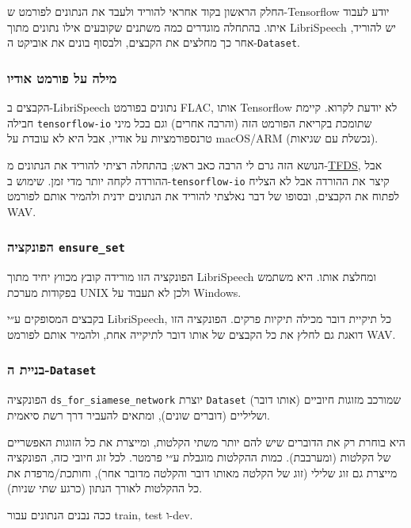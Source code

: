 \documentclass[a4paper]{article}
\begin{document}
החלק הראשון בקוד אחראי להוריד ולעבד את הנתונים לפורמט ש-Tensorflow
יודע לעבוד איתו. בהתחלה מוגדרים כמה משתנים שקובעים אילו נתונים מתוך
LibriSpeech יש להוריד, אחר כך מחלצים את הקבצים, ולבסוף בונים את אוביקט
ה-\texttt{Dataset}.

\subsubsection{מילה על פורמט אודיו}
\label{sec:wav}

הקבצים ב-LibriSpeech נתונים בפורמט FLAC, אותו Tensorflow לא יודעת
לקרוא. קיימת חבילה \texttt{tensorflow-io} שתומכת בקריאת הפורמט הזה
(והרבה אחרים) וגם בכל מיני טרנספורמציות על אודיו, אבל היא לא עובדת על
macOS/ARM (נכשלת עם שגיאות).

הנושא הזה גרם לי הרבה כאב ראש; בהתחלה רציתי להוריד את הנתונים
מ-\href{https://www.tensorflow.org/datasets/catalog/librispeech}{TFDS},
אבל ההורדה לקחה יותר מדי זמן. שימוש ב-\texttt{tensorflow-io} קיצר את
ההורדה אבל לא הצליח לפתוח את הקבצים, ובסופו של דבר נאלצתי להוריד את
הנתונים ידנית ולהמיר אותם לפורמט WAV.

\subsubsection{הפונקציה \texttt{ensure\_set}}
\label{sec:code-ensure_set}

הפונקציה הזו מורידה קובץ מכווץ יחיד מתוך LibriSpeech ומחלצת אותו. היא
משתמש בפקודות מערכת UNIX ולכן לא תעבוד על Windows.

בקבצים המסופקים ע״י LibriSpeech, כל תיקיית דובר מכילה תיקיות פרקים.
הפונקציה הזו דואגת גם לחלץ את כל הקבצים של אותו דובר לתיקייה אחת,
ולהמיר אותם לפורמט WAV.

\subsubsection{בניית ה-\texttt{Dataset}}
\label{sec:code-dataset-obj}

הפונקציה \texttt{ds\_for\_siamese\_network} יוצרת \texttt{Dataset}
שמורכב מזוגות חיוביים (אותו דובר) ושליליים (דוברים שונים), ומתאים
להעביר דרך רשת סיאמית.

היא בוחרת רק את הדוברים שיש להם יותר משתי הקלטות, ומייצרת את כל הזוגות
האפשריים של הקלטות (ומערבבת). כמות ההקלטות מוגבלת ע״י פרמטר. לכל זוג
חיובי כזה, הפונקציה מייצרת גם זוג שלילי (זוג של הקלטה מאותו דובר
והקלטה מדובר אחר), וחותכת/מרפדת את כל ההקלטות לאורך הנתון (כרגע שתי
שניות).

ככה נבנים הנתונים עבור train, test ו-dev.
\end{document}
